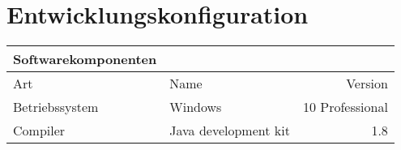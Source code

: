 \section{Entwicklungskonfiguration}
\begin{table}[h!]
	\begin{tabular}{llr} 
	\toprule
	Softwarekomponenten\\  
	\midrule 
	Art & Name & Version\\ 
	\midrule 
	Betriebssystem & Windows & 10 Professional\\ 
	Compiler & Java development kit & 1.8\\
	\bottomrule
	\end{tabular}
	\label{tab:ablaufbedingungen}
\end{table}